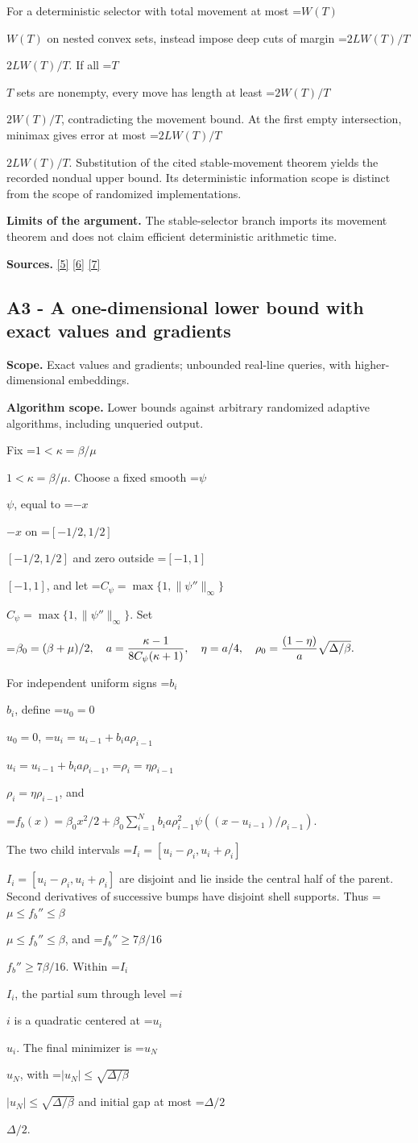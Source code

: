 \documentclass[10pt,a4paper]{article}
\newcommand{\AtlasMath}[1]{\par\begingroup\centering\setbox0=\hbox{$\displaystyle #1$}\ifdim\wd0>1.4\linewidth\typeout{ATLAS WIDE FORMULA: \the\wd0}\fi\ifdim\wd0>\linewidth\resizebox{\linewidth}{!}{\box0}\else\box0\fi\par\endgroup}
\newcommand{\AtlasInlineMath}[1]{\begingroup\setbox0=\hbox{$#1$}\ifdim\wd0>.4\linewidth\endgroup\AtlasMath{#1}\else\endgroup$#1$\fi}
\begin{document}
For a deterministic selector with total movement at most \AtlasInlineMath{W(T)} on nested convex sets, instead impose deep cuts of margin \AtlasInlineMath{2LW(T)/T}. If all \AtlasInlineMath{T} sets are nonempty, every move has length at least \AtlasInlineMath{2W(T)/T}, contradicting the movement bound. At the first empty intersection, minimax gives error at most \AtlasInlineMath{2LW(T)/T}. Substitution of the cited stable-movement theorem yields the recorded nondual upper bound. Its deterministic information scope is distinct from the scope of randomized implementations.

\textbf{Limits of the argument.} The stable-selector branch imports its movement theorem and does not claim efficient deterministic arithmetic time.

\textbf{Sources.} \href{https://arxiv.org/pdf/1405.4980}{[5]} \href{https://www2.isye.gatech.edu/~nemirovs/MOR_AccuracyCertificates.pdf}{[6]} \href{https://arxiv.org/pdf/2609.20701}{[7]}

\subsection{A3 - A one-dimensional lower bound with exact values and gradients}
\textbf{Scope.} Exact values and gradients; unbounded real-line queries, with higher-dimensional embeddings.

\textbf{Algorithm scope.} Lower bounds against arbitrary randomized adaptive algorithms, including unqueried output.

Fix \AtlasInlineMath{1<\kappa=\beta/\mu}. Choose a fixed smooth \AtlasInlineMath{\psi}, equal to \AtlasInlineMath{-x} on \AtlasInlineMath{[-1/2,1/2]} and zero outside \AtlasInlineMath{[-1,1]}, and let \AtlasInlineMath{C_\psi=\max\{1,\|\psi''\|_\infty\}}. Set

\AtlasMath{\beta_0=(\beta+\mu)/2,\quad a={\kappa-1\over8C_\psi(\kappa+1)},\quad
\eta=a/4,\quad \rho_0={(1-\eta)\over a}\sqrt{\Delta/\beta}.}

For independent uniform signs \AtlasInlineMath{b_i}, define \AtlasInlineMath{u_0=0},
\AtlasInlineMath{u_i=u_{i-1}+b_i a\rho_{i-1}}, \AtlasInlineMath{\rho_i=\eta\rho_{i-1}}, and

\AtlasMath{f_b(x)=\beta_0x^2/2+
\beta_0\sum_{i=1}^N b_i a\rho_{i-1}^2
\psi((x-u_{i-1})/\rho_{i-1}).}

The two child intervals \AtlasInlineMath{I_i=[u_i-\rho_i,u_i+\rho_i]} are disjoint and lie inside the central half of the parent. Second derivatives of successive bumps have disjoint shell supports. Thus \AtlasInlineMath{\mu\le f_b''\le\beta}, and \AtlasInlineMath{f_b''\ge7\beta/16}. Within \AtlasInlineMath{I_i}, the partial sum through level \AtlasInlineMath{i} is a quadratic centered at \AtlasInlineMath{u_i}. The final minimizer is \AtlasInlineMath{u_N}, with \AtlasInlineMath{|u_N|\le\sqrt{\Delta/\beta}} and initial gap at most \AtlasInlineMath{\Delta/2}.
\end{document}
